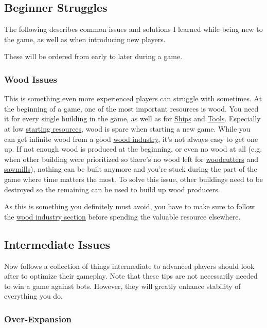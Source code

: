 \documentclass[12pt]{article}
\begin{document}
\subsection{Beginner Struggles}
\label{sec:beginnerstruggles}

The following describes common issues and solutions I learned while being new to the game, as well as when introducing new players.

These will be ordered from early to later during a game.

\subsubsection{Wood Issues}
\label{sec:woodissues}

This is something even more experienced players can struggle with sometimes. At the beginning of a game, one of the most important resources is wood. You need it for every single building in the game, as well as for \hyperref[sec:ships]{Ships} and \hyperref[sec:metalworks]{Tools}. Especially at low \hyperref[sec:startingresources]{starting resources}, wood is spare when starting a new game. While you can get infinite wood from a good \hyperref[sec:woodindustry]{wood industry}, it's not always easy to get one up. If not enough wood is produced at the beginning, or even no wood at all (e.g. when other building were prioritized so there's no wood left for \hyperref[sec:woodcutter]{woodcutters} and \hyperref[sec:sawmill]{sawmills}), nothing can be built anymore and you're stuck during the part of the game where time matters the most. To solve this issue, other buildings need to be destroyed so the remaining can be used to build up wood producers.

As this is something you definitely must avoid, you have to make sure to follow the \hyperref[sec:woodindustry]{wood industry section} before spending the valuable resource elsewhere.

\subsection{Intermediate Issues}
\label{sec:intermediateissues}

Now follows a collection of things intermediate to advanced players should look after to optimize their gameplay. Note that these tips are not necessarily needed to win a game against bots. However, they will greatly enhance stability of everything you do.

\subsubsection{Over-Expansion}
\label{sec:overexpansion}
\end{document}
